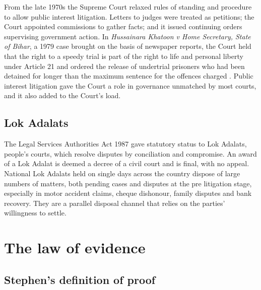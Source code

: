 From the late 1970s the Supreme Court relaxed rules of standing and procedure to allow public interest litigation. Letters to judges were treated as petitions; the Court appointed commissions to gather facts; and it issued continuing orders supervising government action. In \emph{Hussainara Khatoon v Home Secretary, State of Bihar}, a 1979 case brought on the basis of newspaper reports, the Court held that the right to a speedy trial is part of the right to life and personal liberty under Article 21 and ordered the release of undertrial prisoners who had been detained for longer than the maximum sentence for the offences charged \citep{hussainara1979}. Public interest litigation gave the Court a role in governance unmatched by most courts, and it also added to the Court's load.

\subsection{Lok Adalats}

The Legal Services Authorities Act 1987 gave statutory status to Lok Adalats, people's courts, which resolve disputes by conciliation and compromise. An award of a Lok Adalat is deemed a decree of a civil court and is final, with no appeal. National Lok Adalats held on single days across the country dispose of large numbers of matters, both pending cases and disputes at the pre litigation stage, especially in motor accident claims, cheque dishonour, family disputes and bank recovery. They are a parallel disposal channel that relies on the parties' willingness to settle.

\section{The law of evidence}

\subsection{Stephen's definition of proof}


